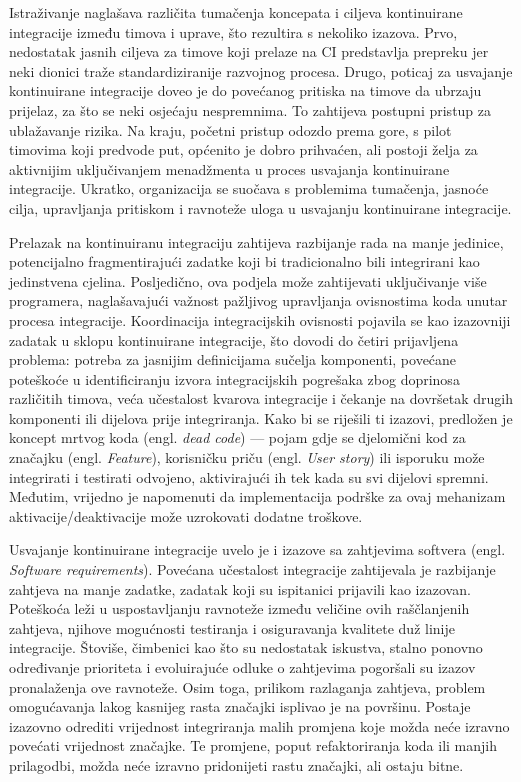 \documentclass[a4paper,12pt,oneside]{article}
\begin{document}
Istraživanje naglašava različita tumačenja koncepata i ciljeva kontinuirane integracije između timova i uprave, što rezultira s nekoliko izazova. Prvo, nedostatak jasnih ciljeva za timove koji prelaze na CI predstavlja prepreku jer neki dionici traže standardiziranije razvojnog procesa. Drugo, poticaj za usvajanje kontinuirane integracije doveo je do povećanog pritiska na timove da ubrzaju prijelaz, za što se neki osjećaju nespremnima. To zahtijeva postupni pristup za ublažavanje rizika. Na kraju, početni pristup odozdo prema gore, s pilot timovima koji predvode put, općenito je dobro prihvaćen, ali postoji želja za aktivnijim uključivanjem menadžmenta u proces usvajanja kontinuirane integracije. Ukratko, organizacija se suočava s problemima tumačenja, jasnoće cilja, upravljanja pritiskom i ravnoteže uloga u usvajanju kontinuirane integracije.

Prelazak na kontinuiranu integraciju zahtijeva razbijanje rada na manje jedinice, potencijalno fragmentirajući zadatke koji bi tradicionalno bili integrirani kao jedinstvena cjelina. Posljedično, ova podjela može zahtijevati uključivanje više programera, naglašavajući važnost pažljivog upravljanja ovisnostima koda unutar procesa integracije. Koordinacija integracijskih ovisnosti pojavila se kao izazovniji zadatak u sklopu kontinuirane integracije, što dovodi do četiri prijavljena problema: potreba za jasnijim definicijama sučelja komponenti, povećane poteškoće u identificiranju izvora integracijskih pogrešaka zbog doprinosa različitih timova, veća učestalost kvarova integracije i čekanje na dovršetak drugih komponenti ili dijelova prije integriranja. Kako bi se riješili ti izazovi, predložen je koncept mrtvog koda (engl. \textit{dead code}) — pojam gdje se djelomični kod za značajku (engl. \textit{Feature}), korisničku priču (engl. \textit{User story}) ili isporuku može integrirati i testirati odvojeno, aktivirajući ih tek kada su svi dijelovi spremni. Međutim, vrijedno je napomenuti da implementacija podrške za ovaj mehanizam aktivacije/deaktivacije može uzrokovati dodatne troškove. 

Usvajanje kontinuirane integracije uvelo je i izazove sa zahtjevima softvera (engl. \textit{Software requirements}). Povećana učestalost integracije zahtijevala je razbijanje zahtjeva na manje zadatke, zadatak koji su ispitanici prijavili kao izazovan. Poteškoća leži u uspostavljanju ravnoteže između veličine ovih raščlanjenih zahtjeva, njihove mogućnosti testiranja i osiguravanja kvalitete duž linije integracije. Štoviše, čimbenici kao što su nedostatak iskustva, stalno ponovno određivanje prioriteta i evoluirajuće odluke o zahtjevima pogoršali su izazov pronalaženja ove ravnoteže. Osim toga, prilikom razlaganja zahtjeva, problem omogućavanja lakog kasnijeg rasta značajki isplivao je na površinu. Postaje izazovno odrediti vrijednost integriranja malih promjena koje možda neće izravno povećati vrijednost značajke. Te promjene, poput refaktoriranja koda ili manjih prilagodbi, možda neće izravno pridonijeti rastu značajki, ali ostaju bitne.
\end{document}
